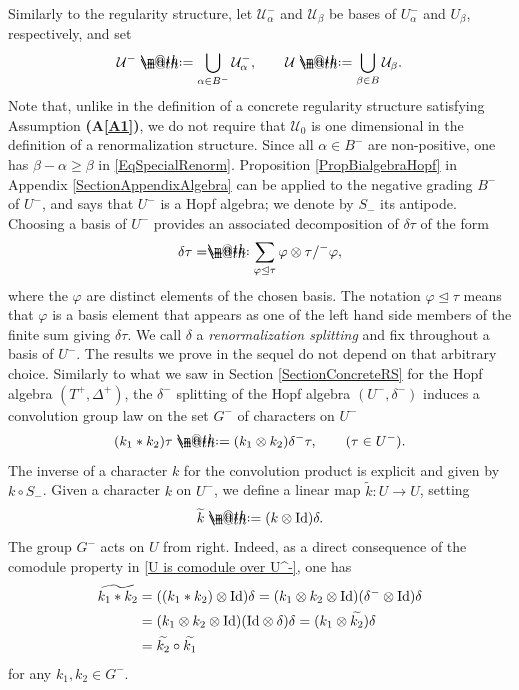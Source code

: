 \documentclass[10pt, reqno]{amsart}
\makeatletter
\numberwithin{subsection}{section}
\numberwithin{subsubsection}{subsection}
\numberwithin{equation}{section} %
\theoremstyle{mystyle}
\theoremstyle{mystyle2}
\theoremstyle{mystyle3}
\newcommand{\refA}[1]{\textbf{\textsf{(A\ref{#1})}}}
\newcommand{\iden}{\text{\rm Id}}
\newcommand\mcU{\mathcal U}
\newcommand*{\defeq}{\mathrel{\rlap{%
                     \raisebox{0.3ex}{$\m@th\cdot$}}%
                     \raisebox{-0.3ex}{$\m@th\cdot$}}%
                     =}
\newcommand*{\eqdef}{=\mathrel{\rlap{%
                     \raisebox{0.3ex}{$\m@th\cdot$}}%
                     \raisebox{-0.3ex}{$\m@th\cdot$}}%
                     }
\makeatother
\begin{document}
Similarly to the regularity structure, let $\mcU_\alpha^-$  and $\mcU_\beta$ be bases of $U_\alpha^-$ and $U_\beta$, respectively, and set
$$
\mcU^- \defeq  \bigcup_{\alpha\in B^-} \mcU_\alpha^-, \qquad \mcU \defeq  \bigcup_{\beta\in B} \mcU_\beta.
$$ 
Note that, unlike in the definition of a concrete regularity structure satisfying Assumption \refA{A1}, we do not require that $\mcU_0$ is one dimensional in the definition of a renormalization structure. Since all $\alpha\in B^-$ are non-positive, one has $\beta-\alpha\geq \beta$ in \eqref{EqSpecialRenorm}. Proposition \ref{PropBialgebraHopf} in Appendix {\sf \ref{SectionAppendixAlgebra}} can be applied to the negative grading $B^-$ of $U^-$, and says that $U^-$ is a Hopf algebra; we denote by $S_-$ its antipode. Choosing a basis of $U^-$ provides an associated decomposition of $\delta\tau$ of the form
\begin{align}\label{section 5: trianglelefteq}
\delta\tau \eqdef \sum_{\varphi\trianglelefteq\tau} \varphi\otimes \tau/^-\varphi,
\end{align}
where the $\varphi$ are distinct elements of the chosen basis. The notation $\varphi\trianglelefteq\tau$ means that $\varphi$ is a basis element that appears as one of the left hand side members of the finite sum giving $\delta\tau$. We call $\delta$ a \textit{renormalization splitting} and fix throughout a basis of $U^-$. The results we prove in the sequel do not depend on that arbitrary choice. Similarly to what we saw in Section \ref{SectionConcreteRS} for the Hopf algebra $(T^+,\Delta^+)$, the $\delta^-$ splitting of the Hopf algebra $(U^-,\delta^-)$ induces a convolution group law on the set $G^-$ of characters on $U^-$
$$
(k_1*k_2)\tau
\defeq  (k_1\otimes k_2)\delta^-\tau, \qquad (\tau\in U^-).
$$
The inverse of a character $k$ for the convolution product is explicit and given by $k\circ S_-$. Given a character $k$ on $U^-$, we define a linear map $\widetilde{k}: U\rightarrow U$, setting   
$$
\widetilde{k} \defeq  (k\otimes\textrm{Id})\delta.
$$
The group $G^-$ acts on $U$ from right. Indeed, as a direct consequence of the comodule property in \eqref{U is comodule over U^-}, one has
\begin{align*}
\widetilde{k_1*k_2} &= ((k_1*k_2)\otimes\iden)\delta
=(k_1\otimes k_2\otimes\iden)(\delta^-\otimes\iden)\delta\\
&=(k_1\otimes k_2\otimes\iden)(\iden\otimes\delta)\delta=
(k_1\otimes\widetilde{k_2})\delta\\
&=\widetilde{k_2} \circ \widetilde{k_1}
\end{align*}
for any $k_1,k_2\in G^-$.
\end{document}
